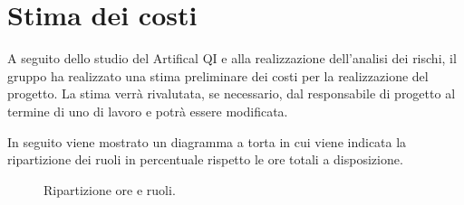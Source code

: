 \section{Stima dei costi}

\label{sec:stima_costi}
A seguito dello studio del  Artifical QI e alla realizzazione dell'analisi dei rischi, 
il gruppo ha realizzato una stima preliminare dei costi per la realizzazione del progetto.
La stima verrà rivalutata, se necessario, dal responsabile di progetto al termine di uno  di lavoro e potrà essere modificata.

\begin{table}[H]
    \centering
    \caption{Ripartizione ore e costi.}
    \label{tab:stima_costi_totali} 
\end{table}

In seguito viene mostrato un diagramma a torta in cui viene indicata la ripartizione dei ruoli in percentuale rispetto le ore totali a disposizione.

\begin{figure}[H]
    \centering
    \caption{Ripartizione ore e ruoli.}
    \label{fig:pie_ruoli_totali}
\end{figure}